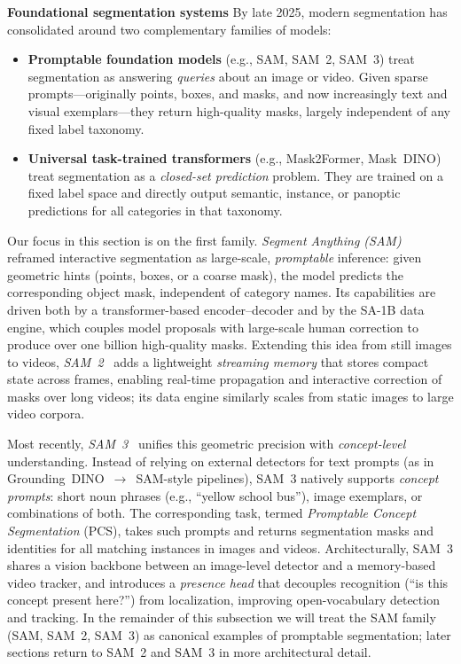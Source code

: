\newpage

\begin{enrichment}
	\label{enr:sec_chapter15_towards_sota_segmentation}
	\noindent\textbf{Foundational segmentation systems}
	By late 2025, modern segmentation has consolidated around two complementary families of models:
	
	\begin{itemize}
		\item \textbf{Promptable foundation models} (e.g., SAM, SAM~2, SAM~3) treat segmentation as answering \emph{queries} about an image or video. Given sparse prompts---originally points, boxes, and masks, and now increasingly text and visual exemplars---they return high-quality masks, largely independent of any fixed label taxonomy.
		\item \textbf{Universal task-trained transformers} (e.g., Mask2Former, Mask~DINO) treat segmentation as a \emph{closed-set prediction} problem. They are trained on a fixed label space and directly output semantic, instance, or panoptic predictions for all categories in that taxonomy.
	\end{itemize}
	
	\noindent
	Our focus in this section is on the first family. \emph{Segment Anything (SAM)}~\cite{kirillov2023_sam} reframed interactive segmentation as large-scale, \emph{promptable} inference: given geometric hints (points, boxes, or a coarse mask), the model predicts the corresponding object mask, independent of category names. Its capabilities are driven both by a transformer-based encoder--decoder and by the SA-1B data engine, which couples model proposals with large-scale human correction to produce over one billion high-quality masks. Extending this idea from still images to videos, \emph{SAM~2}~\cite{ravi2024_sam2} adds a lightweight \emph{streaming memory} that stores compact state across frames, enabling real-time propagation and interactive correction of masks over long videos; its data engine similarly scales from static images to large video corpora.
	
	\medskip
	\noindent Most recently, \emph{SAM~3}~\cite{carion2025_sam3} unifies this geometric precision with \emph{concept-level} understanding. Instead of relying on external detectors for text prompts (as in Grounding~DINO~$\to$~SAM-style pipelines), SAM~3 natively supports \emph{concept prompts}: short noun phrases (e.g., ``yellow school bus''), image exemplars, or combinations of both. The corresponding task, termed \emph{Promptable Concept Segmentation} (PCS), takes such prompts and returns segmentation masks and identities for all matching instances in images and videos. Architecturally, SAM~3 shares a vision backbone between an image-level detector and a memory-based video tracker, and introduces a \emph{presence head} that decouples recognition (``is this concept present here?'') from localization, improving open-vocabulary detection and tracking. In the remainder of this subsection we will treat the SAM family (SAM, SAM~2, SAM~3) as canonical examples of promptable segmentation; later sections return to SAM~2 and SAM~3 in more architectural detail.
	

\end{enrichment}
